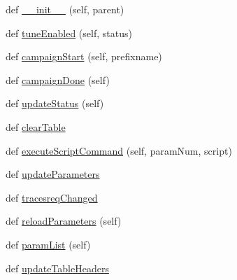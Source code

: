 \begin{DoxyCompactItemize}
\item 
def \hyperlink{classsoftware_1_1chipwhisperer_1_1capture_1_1utils_1_1GlitchExplorerDialog_1_1GlitchExplorerDialog_a6f2c869d22eac4fba5d94bb89f56425a}{\+\_\+\+\_\+init\+\_\+\+\_\+} (self, parent)
\item 
def \hyperlink{classsoftware_1_1chipwhisperer_1_1capture_1_1utils_1_1GlitchExplorerDialog_1_1GlitchExplorerDialog_a92fd1d08330b8ebf577dcb7d5705e37a}{tune\+Enabled} (self, status)
\item 
def \hyperlink{classsoftware_1_1chipwhisperer_1_1capture_1_1utils_1_1GlitchExplorerDialog_1_1GlitchExplorerDialog_a0eb8a65ea9ac45effdd0596fc7054a60}{campaign\+Start} (self, prefixname)
\item 
def \hyperlink{classsoftware_1_1chipwhisperer_1_1capture_1_1utils_1_1GlitchExplorerDialog_1_1GlitchExplorerDialog_a359f83055f90f91a9e874fc85c8b9030}{campaign\+Done} (self)
\item 
def \hyperlink{classsoftware_1_1chipwhisperer_1_1capture_1_1utils_1_1GlitchExplorerDialog_1_1GlitchExplorerDialog_a982e48100acf57d0f0430942dc7036c9}{update\+Status} (self)
\item 
def \hyperlink{classsoftware_1_1chipwhisperer_1_1capture_1_1utils_1_1GlitchExplorerDialog_1_1GlitchExplorerDialog_addaa9a78d2e1dc34317373f7b8ec9618}{clear\+Table}
\item 
def \hyperlink{classsoftware_1_1chipwhisperer_1_1capture_1_1utils_1_1GlitchExplorerDialog_1_1GlitchExplorerDialog_ab737d4cba1356b6fe6b94aeb301e8aa5}{execute\+Script\+Command} (self, param\+Num, script)
\item 
def \hyperlink{classsoftware_1_1chipwhisperer_1_1capture_1_1utils_1_1GlitchExplorerDialog_1_1GlitchExplorerDialog_a7d193aa0c43d15a00b80956c32dad258}{update\+Parameters}
\item 
def \hyperlink{classsoftware_1_1chipwhisperer_1_1capture_1_1utils_1_1GlitchExplorerDialog_1_1GlitchExplorerDialog_a574290ed53665549f8a3efeff10add2a}{tracesreq\+Changed}
\item 
def \hyperlink{classsoftware_1_1chipwhisperer_1_1capture_1_1utils_1_1GlitchExplorerDialog_1_1GlitchExplorerDialog_a31ae6ee8a108306db085ee0eb8b4122d}{reload\+Parameters} (self)
\item 
def \hyperlink{classsoftware_1_1chipwhisperer_1_1capture_1_1utils_1_1GlitchExplorerDialog_1_1GlitchExplorerDialog_adab885fdced387456b7b6838e3df047f}{param\+List} (self)
\item 
def \hyperlink{classsoftware_1_1chipwhisperer_1_1capture_1_1utils_1_1GlitchExplorerDialog_1_1GlitchExplorerDialog_a19aa7b1ddaec5a1bed3603b3c6bb8f79}{update\+Table\+Headers}

\end{DoxyCompactItemize}
